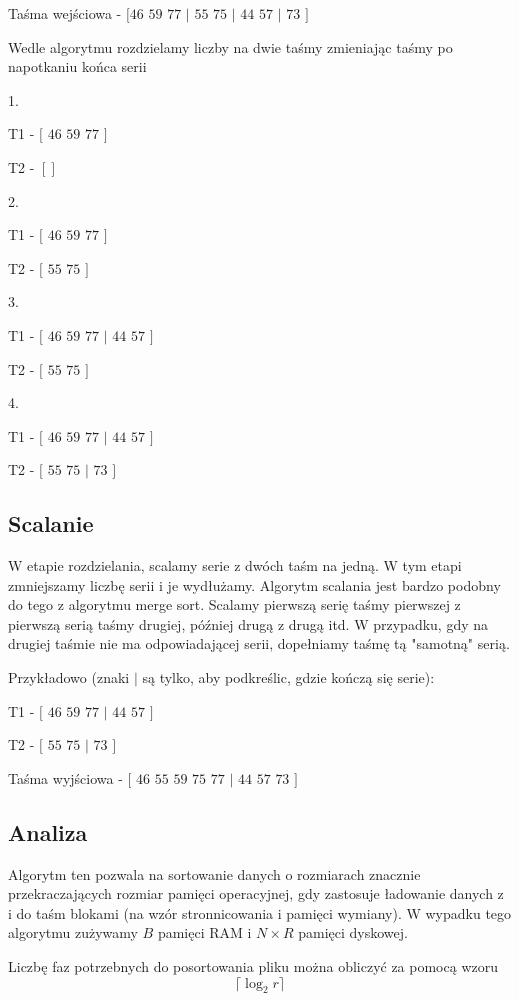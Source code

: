 \documentclass{article}
\begin{document}
Taśma wejściowa - $[$$46$ $59$ $77$ $|$ $55$ $75$ $|$ $44$ $57$ $|$ $73$ $]$

Wedle algorytmu rozdzielamy liczby na dwie taśmy zmieniając taśmy po napotkaniu końca serii

1.

T1 - $[$ $46$ $59$ $77$ $]$

T2 - $[]$


2.

T1 - $[$ $46$ $59$ $77$ $]$

T2 - $[$ $55$ $75$ $]$


3.

T1 - $[$ $46$ $59$ $77$ $|$ $44$ $57$ $]$

T2 - $[$ $55$ $75$ $]$

4.

T1 - $[$ $46$ $59$ $77$ $|$ $44$ $57$ $]$

T2 - $[$ $55$ $75$ $|$ $73$ $]$

\subsection{Scalanie}
W etapie rozdzielania, scalamy serie z dwóch taśm na jedną. W tym etapi zmniejszamy liczbę serii i je wydłużamy. Algorytm scalania jest bardzo podobny do tego z algorytmu merge sort. Scalamy pierwszą serię taśmy pierwszej z pierwszą serią taśmy drugiej, później drugą z drugą itd. W przypadku, gdy na drugiej taśmie nie ma odpowiadającej serii, dopełniamy taśmę tą "samotną" serią.

Przykładowo (znaki $|$ są tylko, aby podkreślic, gdzie kończą się serie):

T1 - $[$ $46$ $59$ $77$ $|$ $44$ $57$ $]$

T2 - $[$ $55$ $75$ $|$ $73$ $]$

Taśma wyjściowa - $[$ $46$ $55$ $59$ $75$ $77$ $|$ $44$ $57$ $73$ $]$

\subsection{Analiza}
Algorytm ten pozwala na sortowanie danych o rozmiarach znacznie przekraczających rozmiar pamięci operacyjnej, gdy zastosuje ładowanie danych z i do taśm blokami (na wzór stronnicowania i pamięci wymiany). W wypadku tego algorytmu zużywamy $B$ pamięci RAM i $N \times R$ pamięci dyskowej.  

Liczbę faz potrzebnych do posortowania pliku można obliczyć za pomocą wzoru
$$\lceil \log_2 r \rceil$$
\end{document}
